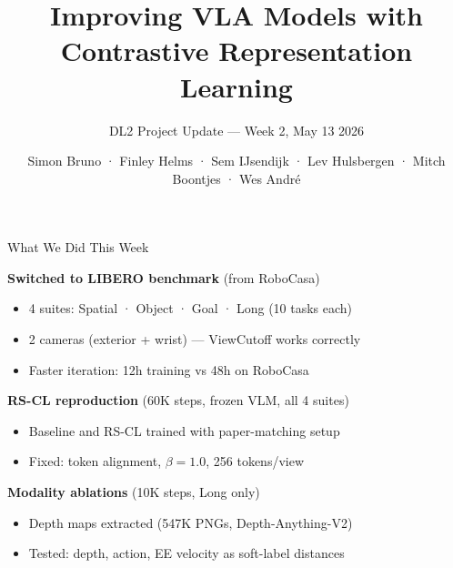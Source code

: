 \documentclass[10pt]{beamer}
\title{Improving VLA Models with\\Contrastive Representation Learning}
\subtitle{DL2 Project Update — Week 2, May 13 2026}
\author{Simon Bruno · Finley Helms · Sem IJsendijk · Lev Hulsbergen · Mitch Boontjes · Wes André}
\institute{University of Amsterdam}
\date{}
\begin{document}
\maketitle

\begin{frame}{What We Did This Week}

\textbf{Switched to LIBERO benchmark} (from RoboCasa)
\begin{itemize}
  \item 4 suites: Spatial · Object · Goal · Long (10 tasks each)
  \item 2 cameras (exterior + wrist) — ViewCutoff works correctly
  \item Faster iteration: 12h training vs 48h on RoboCasa
\end{itemize}

\vspace{0.8em}

\textbf{RS-CL reproduction} (60K steps, frozen VLM, all 4 suites)
\begin{itemize}
  \item Baseline and RS-CL trained with paper-matching setup
  \item Fixed: token alignment, $\beta=1.0$, 256 tokens/view
\end{itemize}

\vspace{0.8em}

\textbf{Modality ablations} (10K steps, Long only)
\begin{itemize}
  \item Depth maps extracted (547K PNGs, Depth-Anything-V2)
  \item Tested: depth, action, EE velocity as soft-label distances
\end{itemize}

\end{frame}
\end{document}
